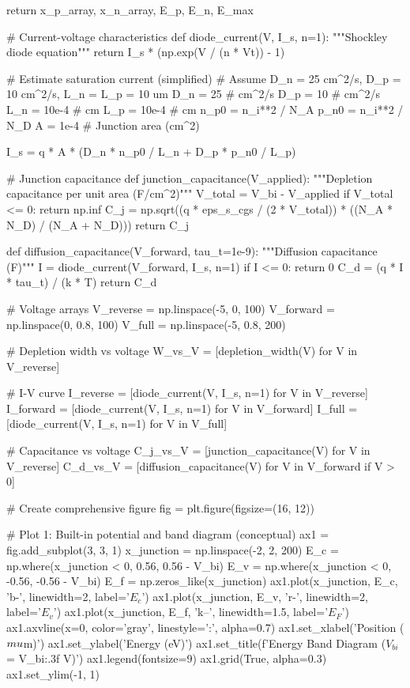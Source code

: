 \documentclass[a4paper, 11pt]{article}
\begin{document}
\begin{pycode}
    return x_p_array, x_n_array, E_p, E_n, E_max

# Current-voltage characteristics
def diode_current(V, I_s, n=1):
    """Shockley diode equation"""
    return I_s * (np.exp(V / (n * Vt)) - 1)

# Estimate saturation current (simplified)
# Assume D_n = 25 cm^2/s, D_p = 10 cm^2/s, L_n = L_p = 10 um
D_n = 25  # cm^2/s
D_p = 10  # cm^2/s
L_n = 10e-4  # cm
L_p = 10e-4  # cm
n_p0 = n_i**2 / N_A
p_n0 = n_i**2 / N_D
A = 1e-4  # Junction area (cm^2)

I_s = q * A * (D_n * n_p0 / L_n + D_p * p_n0 / L_p)

# Junction capacitance
def junction_capacitance(V_applied):
    """Depletion capacitance per unit area (F/cm^2)"""
    V_total = V_bi - V_applied
    if V_total <= 0:
        return np.inf
    C_j = np.sqrt((q * eps_s_cgs / (2 * V_total)) * ((N_A * N_D) / (N_A + N_D)))
    return C_j

def diffusion_capacitance(V_forward, tau_t=1e-9):
    """Diffusion capacitance (F)"""
    I = diode_current(V_forward, I_s, n=1)
    if I <= 0:
        return 0
    C_d = (q * I * tau_t) / (k * T)
    return C_d

# Voltage arrays
V_reverse = np.linspace(-5, 0, 100)
V_forward = np.linspace(0, 0.8, 100)
V_full = np.linspace(-5, 0.8, 200)

# Depletion width vs voltage
W_vs_V = [depletion_width(V) for V in V_reverse]

# I-V curve
I_reverse = [diode_current(V, I_s, n=1) for V in V_reverse]
I_forward = [diode_current(V, I_s, n=1) for V in V_forward]
I_full = [diode_current(V, I_s, n=1) for V in V_full]

# Capacitance vs voltage
C_j_vs_V = [junction_capacitance(V) for V in V_reverse]
C_d_vs_V = [diffusion_capacitance(V) for V in V_forward if V > 0]

# Create comprehensive figure
fig = plt.figure(figsize=(16, 12))

# Plot 1: Built-in potential and band diagram (conceptual)
ax1 = fig.add_subplot(3, 3, 1)
x_junction = np.linspace(-2, 2, 200)
E_c = np.where(x_junction < 0, 0.56, 0.56 - V_bi)
E_v = np.where(x_junction < 0, -0.56, -0.56 - V_bi)
E_f = np.zeros_like(x_junction)
ax1.plot(x_junction, E_c, 'b-', linewidth=2, label='$E_c$')
ax1.plot(x_junction, E_v, 'r-', linewidth=2, label='$E_v$')
ax1.plot(x_junction, E_f, 'k--', linewidth=1.5, label='$E_F$')
ax1.axvline(x=0, color='gray', linestyle=':', alpha=0.7)
ax1.set_xlabel('Position ($\\mu$m)')
ax1.set_ylabel('Energy (eV)')
ax1.set_title(f'Energy Band Diagram ($V_{{bi}}$ = {V_bi:.3f} V)')
ax1.legend(fontsize=9)
ax1.grid(True, alpha=0.3)
ax1.set_ylim(-1, 1)


\end{pycode}
\end{document}

